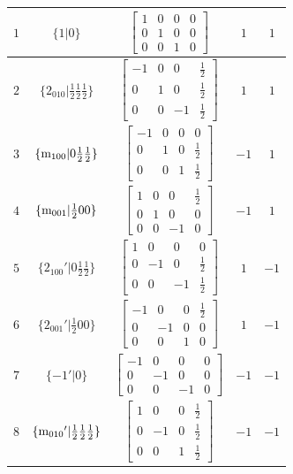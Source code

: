 \documentclass[fleqn,8pt]{jsarticle}
\begin{document}
\begin{longtable}{ccccc}
$ 1 $ & $ \{1|0\} $ & $ \begin{bmatrix} 1 & 0 & 0 & 0 \\ 0 & 1 & 0 & 0 \\ 0 & 0 & 1 & 0 \end{bmatrix} $ & $ 1 $ & $ 1 $ \\ \hline
$ 2 $ & $ \{2{}_{010}|\frac{1}{2} \frac{1}{2} \frac{1}{2}\} $ & $ \begin{bmatrix} -1 & 0 & 0 & \frac{1}{2} \\ 0 & 1 & 0 & \frac{1}{2} \\ 0 & 0 & -1 & \frac{1}{2} \end{bmatrix} $ & $ 1 $ & $ 1 $ \\ \hline
$ 3 $ & $ \{{\rm m}_{100}|0 \frac{1}{2} \frac{1}{2}\} $ & $ \begin{bmatrix} -1 & 0 & 0 & 0 \\ 0 & 1 & 0 & \frac{1}{2} \\ 0 & 0 & 1 & \frac{1}{2} \end{bmatrix} $ & $ -1 $ & $ 1 $ \\ \hline
$ 4 $ & $ \{{\rm m}_{001}|\frac{1}{2} 0 0\} $ & $ \begin{bmatrix} 1 & 0 & 0 & \frac{1}{2} \\ 0 & 1 & 0 & 0 \\ 0 & 0 & -1 & 0 \end{bmatrix} $ & $ -1 $ & $ 1 $ \\ \hline
$ 5 $ & $ \{2{}_{100}{}'|0 \frac{1}{2} \frac{1}{2}\} $ & $ \begin{bmatrix} 1 & 0 & 0 & 0 \\ 0 & -1 & 0 & \frac{1}{2} \\ 0 & 0 & -1 & \frac{1}{2} \end{bmatrix} $ & $ 1 $ & $ -1 $ \\ \hline
$ 6 $ & $ \{2{}_{001}{}'|\frac{1}{2} 0 0\} $ & $ \begin{bmatrix} -1 & 0 & 0 & \frac{1}{2} \\ 0 & -1 & 0 & 0 \\ 0 & 0 & 1 & 0 \end{bmatrix} $ & $ 1 $ & $ -1 $ \\ \hline
$ 7 $ & $ \{-1{}'|0\} $ & $ \begin{bmatrix} -1 & 0 & 0 & 0 \\ 0 & -1 & 0 & 0 \\ 0 & 0 & -1 & 0 \end{bmatrix} $ & $ -1 $ & $ -1 $ \\ \hline
$ 8 $ & $ \{{\rm m}_{010}{}'|\frac{1}{2} \frac{1}{2} \frac{1}{2}\} $ & $ \begin{bmatrix} 1 & 0 & 0 & \frac{1}{2} \\ 0 & -1 & 0 & \frac{1}{2} \\ 0 & 0 & 1 & \frac{1}{2} \end{bmatrix} $ & $ -1 $ & $ -1 $ \\
\end{longtable}
\end{document}
